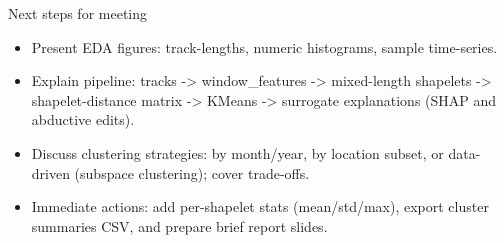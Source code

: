 \documentclass[aspectratio=169]{beamer}
\begin{document}
\begin{frame}{Next steps for meeting}
\begin{itemize}
  \item Present EDA figures: track-lengths, numeric histograms, sample time-series.
  \item Explain pipeline: tracks -> window\_features -> mixed-length shapelets -> shapelet-distance matrix -> KMeans -> surrogate explanations (SHAP and abductive edits).
  \item Discuss clustering strategies: by month/year, by location subset, or data-driven (subspace clustering); cover trade-offs.
  \item Immediate actions: add per-shapelet stats (mean/std/max), export cluster summaries CSV, and prepare brief report slides.
\end{itemize}
\end{frame}
\end{document}
